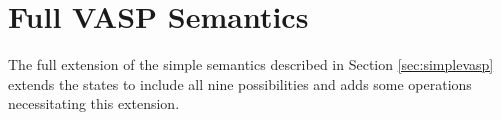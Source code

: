 \section{Full VASP Semantics}

The full extension of the simple semantics described in Section
\ref{sec:simplevasp} extends the states to include all nine possibilities and adds some operations
necessitating this extension.





